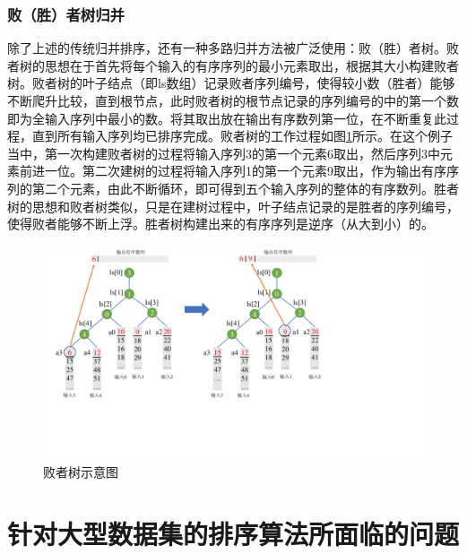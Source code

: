\subsubsection{败（胜）者树归并}
除了上述的传统归并排序，还有一种多路归并方法被广泛使用：败（胜）者树。败者树的思想在于首先将每个输入的有序序列的最小元素取出，根据其大小构建败者树。败者树的叶子结点（即ls数组）记录败者序列编号，使得较小数（胜者）能够不断爬升比较，直到根节点，此时败者树的根节点记录的序列编号的中的第一个数即为全输入序列中最小的数。将其取出放在输出有序数列第一位，在不断重复此过程，直到所有输入序列均已排序完成。败者树的工作过程如图\ref{fig:loser_tree}所示。在这个例子当中，第一次构建败者树的过程将输入序列3的第一个元素6取出，然后序列3中元素前进一位。第二次建树的过程将输入序列1的第一个元素9取出，作为输出有序序列的第二个元素，由此不断循环，即可得到五个输入序列的整体的有序数列。胜者树的思想和败者树类似，只是在建树过程中，叶子结点记录的是胜者的序列编号，使得败者能够不断上浮。胜者树构建出来的有序序列是逆序（从大到小）的。
\begin{figure}[htbp]
    \centering
    \includegraphics[width=\linewidth]{figures/loser_tree.pdf}
    \caption{败者树示意图}
    \label{fig:loser_tree}
\end{figure}


\section{针对大型数据集的排序算法所面临的问题}\label{facing_problems}

